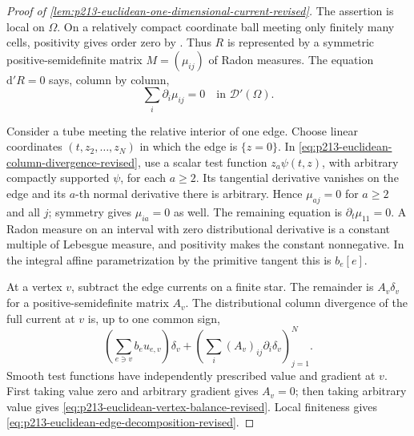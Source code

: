 \begin{proof}[Proof of
\cref{lem:p213-euclidean-one-dimensional-current-revised}]
The assertion is local on $\Omega$.  On a relatively compact coordinate
ball meeting only finitely many cells, positivity gives order zero by
\cite[Proposition~7.2.9]{CLD25}.  Thus $R$ is represented by a symmetric
positive-semidefinite matrix $M=(\mu_{ij})$ of Radon measures.  The
equation $\mathrm d'R=0$ says, column by column,
\begin{equation}
                         \sum_i\partial_i\mu_{ij}=0
                 \quad\text{in }\mathcal D'(\Omega).
\label{eq:p213-euclidean-column-divergence-revised}
\end{equation}

Consider a tube meeting the relative interior of one edge.  Choose linear
coordinates $(t,z_2,\ldots,z_N)$ in which the edge is $\{z=0\}$.  In
\eqref{eq:p213-euclidean-column-divergence-revised}, use a scalar test
function $z_a\psi(t,z)$, with arbitrary compactly supported $\psi$, for
each $a\geq2$.  Its tangential derivative vanishes on the edge and its
$a$-th normal derivative there is arbitrary.  Hence
$\mu_{aj}=0$ for $a\geq2$ and all $j$; symmetry gives
$\mu_{ia}=0$ as well.  The remaining equation is
$\partial_t\mu_{11}=0$.  A Radon measure on an interval with zero
distributional derivative is a constant multiple of Lebesgue measure,
and positivity makes the constant nonnegative.  In the integral affine
parametrization by the primitive tangent this is $b_e[e]$.

At a vertex $v$, subtract the edge currents on a finite star.  The
remainder is $A_v\delta_v$ for a positive-semidefinite matrix $A_v$.
The distributional column divergence of the full current at $v$ is, up to
one common sign,
\begin{equation}
 \left(\sum_{e\ni v}b_eu_{e,v}\right)\delta_v
       +\left(\sum_i(A_v)_{ij}\partial_i\delta_v\right)_{j=1}^N.
\label{eq:p213-euclidean-vertex-distribution-revised}
\end{equation}
Smooth test functions have independently prescribed value and gradient at
$v$.  First taking value zero and arbitrary gradient gives $A_v=0$;
then taking arbitrary value gives
\eqref{eq:p213-euclidean-vertex-balance-revised}.  Local finiteness gives
\eqref{eq:p213-euclidean-edge-decomposition-revised}.
\end{proof}

